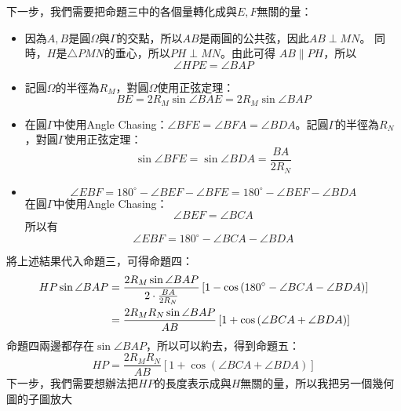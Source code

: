 下一步，我們需要把命題三中的各個量轉化成與$E,F$無關的量：
\begin{itemize}
  \item 因為$A,B$是圓$\Omega$與$\Gamma$的交點，所以$AB$是兩圓的公共弦，因此$AB\perp MN$。
  同時，$H$是$\triangle{PMN}$的垂心，所以$PH\perp MN$。由此可得 $AB\parallel PH$，所以$$\angle{HPE}=\angle{BAP}$$
  \item 記圓$\Omega$的半徑為$R_M$，對圓$\Omega$使用正弦定理：$$BE=2R_M\sin{\angle{BAE}}=2R_M\sin{\angle{BAP}}$$
  \item 在圓$\Gamma$中使用Angle Chasing：$\angle{BFE}=\angle{BFA}=\angle{BDA}$。記圓$\Gamma$的半徑為$R_N$，對圓$\Gamma$使用正弦定理：
  $$\sin{\angle{BFE}}=\sin{\angle{BDA}}=\frac{BA}{2R_N}$$
  \item $$\angle{EBF}=180^{\circ}-\angle{BEF}-\angle{BFE}=180^{\circ}-\angle{BEF}-\angle{BDA}$$
  在圓$\Gamma$中使用Angle Chasing：$$\angle{BEF}=\angle{BCA}$$
  所以有$$\angle{EBF}=180^{\circ}-\angle{BCA}-\angle{BDA}$$

\end{itemize}
將上述結果代入命題三，可得命題四：
\begin{align}
  HP\sin{\angle{BAP}}&=\frac{2R_M\sin{\angle{BAP}}}{2\cdot\frac{BA}{2R_N}}
  \left[1-\cos{\left(180^{\circ}-\angle{BCA}-\angle{BDA}\right)}\right]\notag\\
  &=\frac{2R_MR_N\sin{\angle{BAP}}}{AB}\left[1+\cos{\left(\angle{BCA}+\angle{BDA}\right)}\right]
\end{align}
命題四兩邊都存在$\sin{\angle{BAP}}$，所以可以約去，得到命題五：
\begin{equation}
  HP=\frac{2R_MR_N}{AB}\left[1+\cos{\left(\angle{BCA}+\angle{BDA}\right)}\right]
\end{equation}
下一步，我們需要想辦法把$HP$的長度表示成與$H$無關的量，所以我把另一個幾何圖的子圖放大
\begin{center} %
\end{center}

